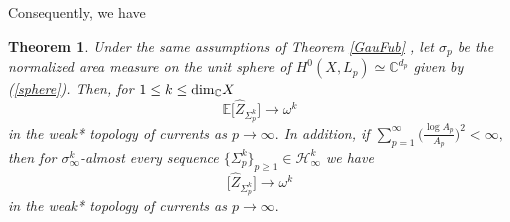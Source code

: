 \documentclass[11pt,leqno,oneside]{amsart}
\newtheorem{thm}{Theorem}[section]
\numberwithin{equation}{section}
\begin{document}
Consequently, we have
\begin{thm} Under the same assumptions of Theorem \ref{GauFub} , let $\sigma_{p}$ be the normalized area measure on the unit sphere of  $H^{0}(X, L_{p})\simeq \mathbb{C}^{d_{p}}$ given by (\ref{sphere}). Then, for $1\leq k \leq \textup{dim}_{\mathbb{C}} X$
	\begin{equation}
		\mathbb{E}\big[\widehat{Z}_{\Sigma_{p}^{k}}\big]\longrightarrow \omega^k
	\end{equation}
	in the weak* topology of currents as $p\rightarrow \infty.$ In addition, if $\sum_{p=1}^{\infty}\big(\frac{\log A_{p}}{A_{p}}\big)^{2}< \infty,$  then for $\sigma_{\infty}^{k}$-almost every sequence $\{\Sigma_{p}^{k}\}_{p\geq 1}\in \mathcal{H}_{\infty}^{k}$ we have
	\begin{equation}
		\big[\widehat{Z}_{\Sigma_{p}^{k}}\big]\longrightarrow \omega^k
	\end{equation}
	in the weak* topology of currents as $p \rightarrow \infty.$
\end{thm}
\end{document}
